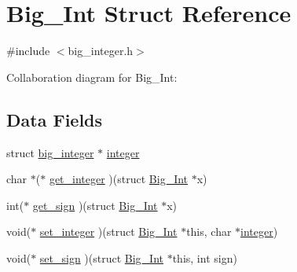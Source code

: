 \hypertarget{struct_big___int}{\section{Big\-\_\-\-Int Struct Reference}
\label{struct_big___int}
}


{\ttfamily \#include $<$big\-\_\-integer.\-h$>$}



Collaboration diagram for Big\-\_\-\-Int\-:
\subsection*{Data Fields}
\begin{DoxyCompactItemize}
\item 
struct \hyperlink{structbig__integer}{big\-\_\-integer} $\ast$ \hyperlink{struct_big___int_af78495b20eeda6242727ea99032693c2}{integer}
\item 
char $\ast$($\ast$ \hyperlink{struct_big___int_ac8d650b12656faee53d9ebd863e9fe8f}{get\-\_\-integer} )(struct \hyperlink{struct_big___int}{Big\-\_\-\-Int} $\ast$x)
\item 
int($\ast$ \hyperlink{struct_big___int_ae06ba678ba07ecdac264605bc8576da2}{get\-\_\-sign} )(struct \hyperlink{struct_big___int}{Big\-\_\-\-Int} $\ast$x)
\item 
void($\ast$ \hyperlink{struct_big___int_a34a65fb8d8cc2acf5a14a18c420ee774}{set\-\_\-integer} )(struct \hyperlink{struct_big___int}{Big\-\_\-\-Int} $\ast$this, char $\ast$\hyperlink{struct_big___int_af78495b20eeda6242727ea99032693c2}{integer})
\item 
void($\ast$ \hyperlink{struct_big___int_a70cf790b3af136aad25fa028cde3e801}{set\-\_\-sign} )(struct \hyperlink{struct_big___int}{Big\-\_\-\-Int} $\ast$this, int sign)
\end{DoxyCompactItemize}


